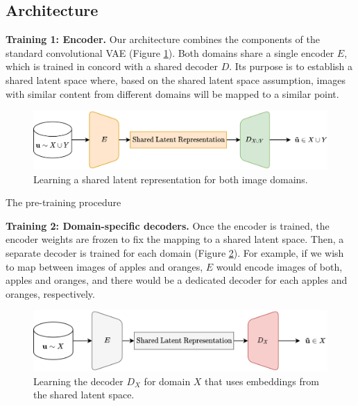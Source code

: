 \documentclass{article}
\begin{document}
\subsection{Architecture}
\textbf{Training 1: Encoder.} Our architecture combines the components of the standard convolutional VAE (Figure \ref{fig:pretrain}). Both domains share a single encoder $E$, which is trained in concord with a shared decoder $D$. Its purpose is to establish a shared latent space where, based on the shared latent space assumption, images with similar content from different domains will be mapped to a similar point.
\begin{figure}[H]
  \centering
  \includegraphics[width=0.7\linewidth]{report/assets/pretrain.png}
  \caption{Learning a shared latent representation for both image domains.}
  \label{fig:pretrain}
\end{figure}
\begin{algorithm}[H]
  \caption{The pre-training procedure}\label{alg:pre-train}
  \begin{algorithmic}
    
    
    
    
  \end{algorithmic}
  \end{algorithm}

\textbf{Training 2: Domain-specific decoders.} Once the encoder is trained, the encoder weights are frozen to fix the mapping to a shared latent space. Then, a separate decoder is trained for each domain (Figure \ref{fig:train}). For example, if we wish to map between images of apples and oranges, $E$ would encode images of both, apples and oranges, and there would be a dedicated decoder for each apples and oranges, respectively. 
\begin{figure}[H]
  \centering
  \includegraphics[width=0.7\linewidth]{report/assets/train.png}
  \caption{Learning the decoder $D_X$ for domain $X$ that uses embeddings from the shared latent space.}
  \label{fig:train}
\end{figure}
    
\end{document}
